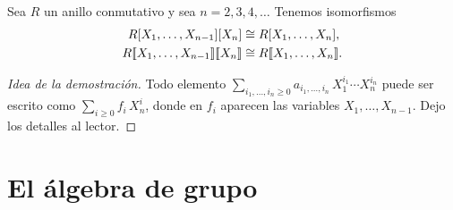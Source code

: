 \begin{proposicion}
  Sea $R$ un anillo conmutativo y sea $n = 2,3,4,\ldots$ Tenemos isomorfismos
  \begin{align*}
    R [X_1,\ldots,X_{n-1}] [X_n] & \cong R [X_1,\ldots,X_n],\\
    R [\![X_1,\ldots,X_{n-1}]\!] [\![X_n]\!] & \cong R [\![X_1,\ldots,X_n]\!].
  \end{align*}

  \begin{proof}[Idea de la demostración]
    Todo elemento
    $\sum_{i_1,\ldots,i_n \ge 0} a_{i_1,\ldots,i_n}\,X_1^{i_1}\cdots X_n^{i_n}$
    puede ser escrito como $\sum_{i \ge 0} f_i\,X_n^i$, donde en $f_i$ aparecen
    las variables $X_1,\ldots,X_{n-1}$. Dejo los detalles al lector.
  \end{proof}
\end{proposicion}


\section{El álgebra de grupo}

